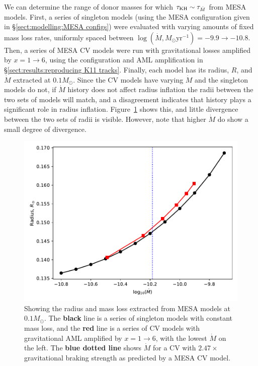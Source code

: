 We can determine the range of donor masses for which $\tau_{\rm KH} \sim \tau_{\dot M}$ from MESA models.
First, a series of singleton models (using the MESA configuration given in \S\ref{sect:modelling:MESA configs}) were evaluated with varying amounts of fixed mass loss rates, uniformly spaced between $\log (\dot M, M_\odot \mathrm{yr}^{-1}) = -9.9 \rightarrow -10.8$.
Then, a series of MESA CV models were run with gravitational losses amplified by $x = 1 \rightarrow 6$, using the configuration and AML amplification in \S\ref{sect:results:reproducing K11 tracks}.
Finally, each model has its radius, $R$, and $\dot M$ extracted at $0.1 M_\odot$. Since the CV models have varying $\dot M$ and the singleton models do not, if $\dot M$ history does not affect radius inflation the radii between the two sets of models will match, and a disagreement indicates that history plays a significant role in radius inflation.
 Figure~\ref{fig:results:comparing radii at 0.1Msun} shows this, and little divergence between the two sets of radii is visible. However, note that higher $\dot M$ do show a small degree of divergence.
\begin{figure}
    \centering
    \includegraphics[width=.8\textwidth]{figures/modelling/compare_0.1Msun_with_CV_track_K11_fig1.pdf}
    \caption{Showing the radius and mass loss extracted from MESA models at $0.1 M_\odot$. The {\bf black} line is a series of singleton models with constant mass loss, and the {\bf red} line is a series of CV models with gravitational AML amplified by $x = 1 \rightarrow 6$, with the lowest $\dot M$ on the left. The {\bf blue dotted line} shows $\dot M$ for a CV with $2.47\times$ gravitational braking strength as predicted by a MESA CV model.}
    \label{fig:results:comparing radii at 0.1Msun}
\end{figure}

